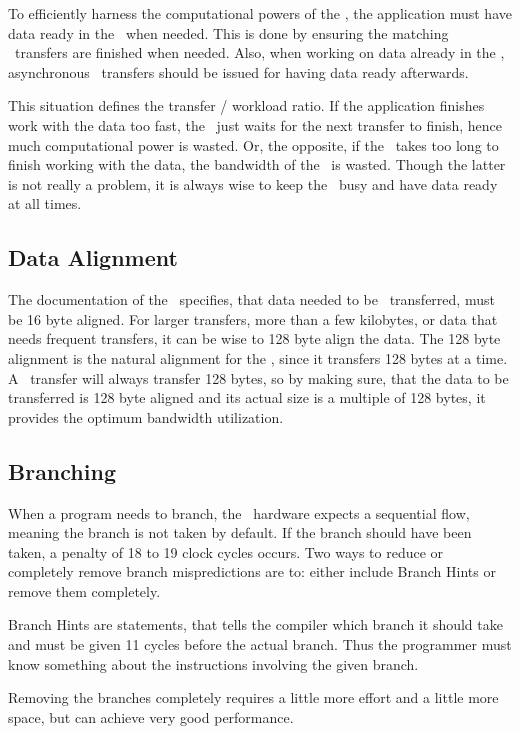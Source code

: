 To efficiently harness the computational powers of the \SPU{}, the
application must have data ready in the \LS\ when needed. This is done
by ensuring the matching \DMA\ transfers are finished when
needed. Also, when working on data already in the \LS{}, asynchronous
\DMA\ transfers should be issued for having data ready afterwards.

This situation defines the transfer / workload ratio. If the application
finishes work with the data too fast, the \SPE\ just waits for the
next transfer to finish, hence much computational power is wasted. Or,
the opposite, if the \SPE\ takes too long to finish working with the
data, the bandwidth of the \EIB\ is wasted. Though the latter is not
really a problem, it is always wise to keep the \EIB\ busy and have
data ready at all times.

\subsection{Data Alignment}
\label{sec:dataalignment}

The documentation of the \CBE\ specifies, that data needed to be
\DMA\ transferred, must be 16 byte aligned. For larger transfers, more
than a few kilobytes, or data that needs frequent transfers, it can be
wise to 128 byte align the data. The 128 byte alignment is the natural
alignment for the \EIB{}, since it transfers 128 bytes at a time. A
\DMA\ transfer will always transfer 128 bytes, so by making sure, that
the data to be transferred is 128 byte aligned and its actual size is a
multiple of 128 bytes, it provides the optimum bandwidth utilization.

\subsection{Branching}
\label{sec:branching}

When a program needs to branch, the \SPE\ hardware expects a
sequential flow, meaning the branch is not taken by default. If the
branch should have been taken, a penalty of 18 to 19 clock cycles
occurs. Two ways to reduce or completely remove branch mispredictions
are to: either include Branch Hints or remove them completely.

Branch Hints are statements, that tells the compiler which branch it
should take and must be given 11 cycles before the actual branch. Thus
the programmer must know something about the instructions involving
the given branch.

Removing the branches completely requires a little more effort and a
little more space, but can achieve very good performance. 

